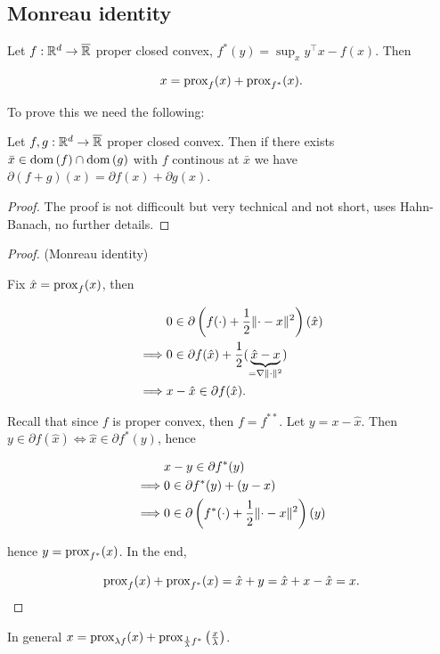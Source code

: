 \subsection{Monreau identity}

\begin{theorem}

    Let $f : \mathbb{R}^d \to \overline{\mathbb{R}}$ proper closed convex, $f^*(y) = \sup_x y^\top x - f(x)$. Then 

    \[ x = \mathrm{prox}_{f} (x) + \mathrm{prox}_{f^*}(x). \]
    
\end{theorem}

To prove this we need the following: 

\begin{lemma}
    
    Let $f,g : \mathbb{R}^d \to \overline{\mathbb{R}}$ proper closed convex. Then if there exists $\bar{x} \in \mathrm{dom}\left(f\right) \cap \mathrm{dom}\left(g\right)$ with $f$ continous at $\bar{x}$ we have $\partial (f + g)(x) = \partial f(x) + \partial g(x)$.

\end{lemma}

\begin{proof}
    The proof is not difficoult but very technical and not short, uses Hahn-Banach, no further details.
\end{proof}

\begin{proof}(Monreau identity)

    Fix $\hat{x} = \mathrm{prox}_{f}(x)$, then 

    \begin{align*}
        &0 \in \partial \left(f(\cdot) + \frac12 \lVert \cdot - x \rVert^2\right)(\hat{x}) \\
        \implies &0 \in \partial f(\hat{x}) + \frac12 (\underbrace{\hat{x}-x}_{= \nabla \lVert \cdot \rVert^2}) \\
        \implies &x - \hat{x} \in \partial f(\hat{x}).
    \end{align*}

    Recall that since $f$ is proper convex, then $f = f^{**}$. Let $y = x - \hat{x}$. Then $y \in \partial f(\hat{x}) \iff \hat{x} \in \partial f^*(y)$, hence 

    \begin{align*}
        &x-y \in \partial f^*(y) \\
        \implies &0 \in  \partial f^*(y) + (y-x) \\
        \implies &0 \in \partial \left(f^*(\cdot) + \frac12 \lVert \cdot - x \rVert^2\right)(y)
    \end{align*}

    hence $y = \mathrm{prox}_{f^*}(x)$. In the end, 

    \[ \mathrm{prox}_{f}(x) + \mathrm{prox}_{f^*}(x) = \hat{x} + y = \hat{x} + x - \hat{x} = x. \]
    
\end{proof}

In general $x = \mathrm{prox}_{\lambda f}(x) + \mathrm{prox}_{\frac{1}{\lambda} f^*}\left(\frac{x}{\lambda}\right)$.


